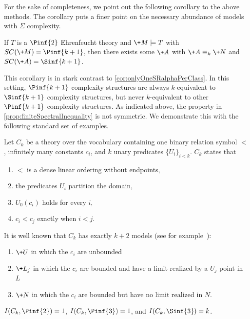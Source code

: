 \documentclass[10pt,a4paper]{amsart}
\renewcommand{\-}{\text{-}}
\begin{document}
For the sake of completeness, we point out the following corollary to the above methods.
The corollary puts a finer point on the necessary abundance of models with $\Sigma$ complexity.

\begin{corollary}
If $T$ is a $\Pinf{2}$ Ehrenfeucht theory and $\+M\models T$ with $SC(\+M)=\Pinf{k+1}$, then there exists some $\+A$ with $\+A\equiv_k \+N$ and $SC(\+A)=\Sinf{k+1}$.
\end{corollary}

This corollary is in stark contrast to \cref{cor:onlyOneSRalphaPerClass}.
In this setting, $\Pinf{k+1}$ complexity structures are always $k$-equivalent to $\Sinf{k+1}$ complexity structures, but never $k$-equivalent to other $\Pinf{k+1}$ complexity structures.
As indicated above, the property in \cref{prop:finiteSpectralInequality} is not symmetric.
We demonstrate this with the following standard set of examples.

\begin{example}\label{ex:kcutModels}
Let $C_k$ be a theory over the vocabulary containing one binary relation symbol $<$, infinitely many constants $c_i$, and $k$ unary predicates $\{U_i\}_{i<k}$.
$C_k$ states that
\begin{enumerate}
	\item $<$ is a dense linear ordering without endpoints,
	\item the predicates $U_i$ partition the domain,
	\item $U_0(c_i)$ holds for every $i$,
	\item $c_i<c_j$ exactly when $i<j$.
\end{enumerate}
\end{example}

It is well known that $C_k$ has exactly $k+2$ models (see for example~\cite[Exercise 2.5.28]{marker2002}):
\begin{enumerate}
	\item $\+U$ in which the $c_i$ are unbounded
	\item $\+L_j$ in which the $c_i$ are bounded and have a limit realized by a $U_j$ point in $L$
	\item $\+N$ in which the $c_i$ are bounded but have no limit realized in $N$.
\end{enumerate}
\begin{proposition}\label{prop:kcutAnalysis}
$I(C_k,\Pinf{2})=1$, $I(C_k,\Pinf{3})=1$, and $I(C_k,\Sinf{3})=k$.
\end{proposition}
\end{document}
